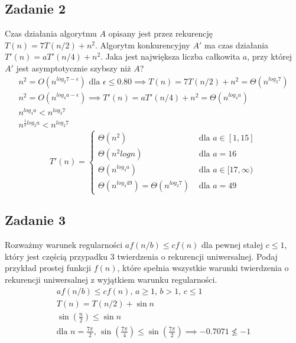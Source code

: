 \documentclass{article}
\begin{document}
\subsection*{Zadanie 2}
Czas działania algorytmu $A$ opisany jest przez rekurencję $T(n) = 7T(n/2) + n^2$.
Algorytm konkurencyjny $A'$ ma czas działania $T '(n) = aT'(n/4) + n^2$. Jaka jest największa
liczba całkowita $a$, przy której $A'$ jest asymptotycznie szybszy niż $A$?
\begin{gather*}
    n^2 = O\left(n^{log_2 7-\epsilon}\right) \text{ dla } \epsilon \leq 0.80 \implies T(n) = 7T(n/2) + n^2 = \Theta\left(n^{log_2 7}\right) \\
    n^2 = O\left(n^{log_4 a-\epsilon}\right) \implies T'(n) = aT'(n/4) + n^2 = \Theta\left(n^{log_4 a}\right) \\
    n^{log_4a} < n^{log_2 7} \\
    n^{\frac{1}{2}log_2a} < n^{log_2 7}
\end{gather*}
\begin{equation*}
    T'(n) = \begin{cases}
        \Theta\left(n^2\right)                                           & \text{ dla } a \in [1, 15]      \\
        \Theta\left(n^2logn\right)                                       & \text{ dla } a = 16             \\
        \Theta\left(n^{log_4 a}\right)                                   & \text{ dla } a \in [17, \infty) \\
        \Theta\left(n^{log_4 49}\right) = \Theta\left(n^{log_2 7}\right) & \text{ dla } a = 49
    \end{cases}
\end{equation*}

\subsection*{Zadanie 3}
Rozważmy warunek regularności $af(n/b) \leq cf(n)$ dla pewnej stałej $c \leq 1$, który jest
częścią przypadku 3 twierdzenia o rekurencji uniwersalnej. Podaj przykład prostej funkcji
$f(n)$, które spełnia wszystkie warunki twierdzenia o rekurencji uniwersalnej z wyjątkiem
warunku regularności.
\begin{gather*}
    af(n/b) \leq cf(n) \text{, } a \geq 1 \text{, } b > 1 \text{, } c \leq 1 \\
    T(n) = T(n/2) + \sin n \\
    \sin\left(\frac{n}{2}\right) \leq \sin n \\
    \text{dla } n = \frac{7\pi}{2} \text{, } \sin\left(\frac{7\pi}{4}\right) \leq \sin \left(\frac{7\pi}{2}\right) \implies -0.7071 \nleq -1
\end{gather*}
\end{document}
